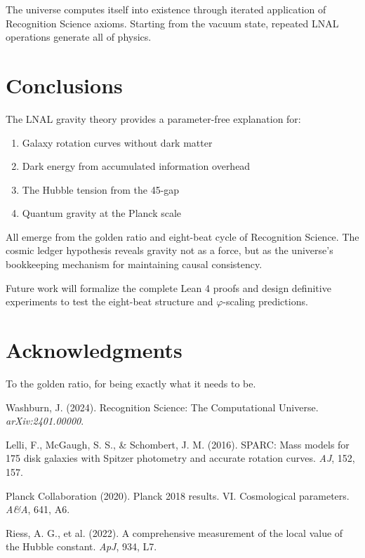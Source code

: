 \documentclass[12pt,a4paper]{article}
\begin{document}
The universe computes itself into existence through iterated application of Recognition Science axioms. Starting from the vacuum state, repeated LNAL operations generate all of physics.

\section{Conclusions}

The LNAL gravity theory provides a parameter-free explanation for:
\begin{enumerate}
\item Galaxy rotation curves without dark matter
\item Dark energy from accumulated information overhead  
\item The Hubble tension from the 45-gap
\item Quantum gravity at the Planck scale
\end{enumerate}

All emerge from the golden ratio and eight-beat cycle of Recognition Science. The cosmic ledger hypothesis reveals gravity not as a force, but as the universe's bookkeeping mechanism for maintaining causal consistency.

Future work will formalize the complete Lean 4 proofs and design definitive experiments to test the eight-beat structure and $\varphi$-scaling predictions.

\section*{Acknowledgments}

To the golden ratio, for being exactly what it needs to be.

\begin{thebibliography}{99}
 Washburn, J. (2024). Recognition Science: The Computational Universe. \textit{arXiv:2401.00000}.

 Lelli, F., McGaugh, S. S., \& Schombert, J. M. (2016). SPARC: Mass models for 175 disk galaxies with Spitzer photometry and accurate rotation curves. \textit{AJ}, 152, 157.

 Planck Collaboration (2020). Planck 2018 results. VI. Cosmological parameters. \textit{A\&A}, 641, A6.

 Riess, A. G., et al. (2022). A comprehensive measurement of the local value of the Hubble constant. \textit{ApJ}, 934, L7.
\end{thebibliography}
\end{document}
